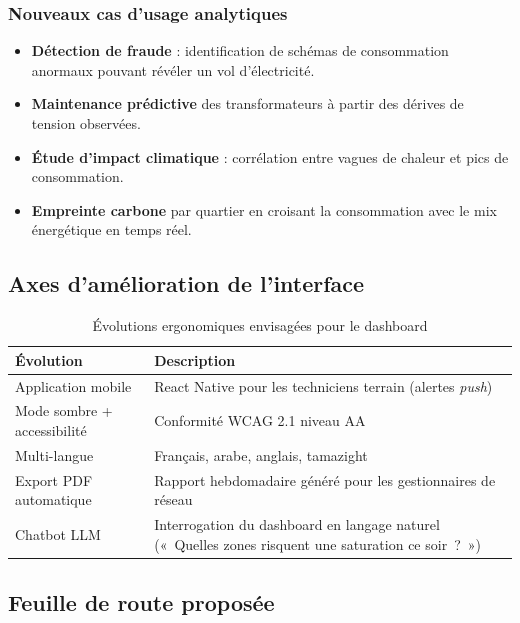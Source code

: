 \documentclass[11pt,a4paper]{article}
\begin{document}
\subsubsection{Nouveaux cas d'usage analytiques}
\begin{itemize}
  \item \textbf{Détection de fraude} : identification de schémas de consommation anormaux pouvant révéler un vol d'électricité.
  \item \textbf{Maintenance prédictive} des transformateurs à partir des dérives de tension observées.
  \item \textbf{Étude d'impact climatique} : corrélation entre vagues de chaleur et pics de consommation.
  \item \textbf{Empreinte carbone} par quartier en croisant la consommation avec le mix énergétique en temps réel.
\end{itemize}

\subsection{Axes d'amélioration de l'interface}

\begin{table}[h!]
\centering
\begin{tabularx}{\textwidth}{lY}
\toprule
{}
\textbf{Évolution} & \textbf{Description} \\
\midrule
Application mobile & React Native pour les techniciens terrain (alertes \emph{push}) \\
Mode sombre + accessibilité & Conformité WCAG 2.1 niveau AA \\
Multi-langue & Français, arabe, anglais, tamazight \\
Export PDF automatique & Rapport hebdomadaire généré pour les gestionnaires de réseau \\
Chatbot LLM & Interrogation du dashboard en langage naturel («~Quelles zones risquent une saturation ce soir~?~») \\
\bottomrule
\end{tabularx}
\caption{Évolutions ergonomiques envisagées pour le dashboard}
\end{table}

\subsection{Feuille de route proposée}
\end{document}
